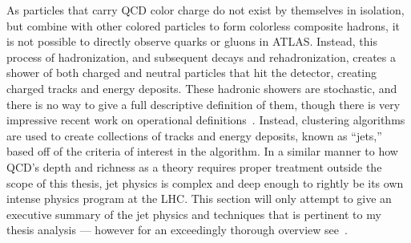 As particles that carry \gls{QCD} color charge do not exist by themselves in isolation, but combine with other colored particles to form colorless composite hadrons, it is not possible to directly observe quarks or gluons in ATLAS.
Instead, this process of hadronization, and subsequent decays and rehadronization, creates a shower of both charged and neutral particles that hit the detector, creating charged tracks and energy deposits.
These hadronic showers are stochastic, and there is no way to give a full descriptive definition of them, though there is very impressive recent work on operational definitions~\cite{Metodiev:2018ftz,Komiske:2018vkc,Larkoski:2019nwj}.
Instead, clustering algorithms are used to create collections of tracks and energy deposits, known as ``jets,'' based off of the criteria of interest in the algorithm.
In a similar manner to how QCD's depth and richness as a theory requires proper treatment outside the scope of this thesis, jet physics is complex and deep enough to rightly be its own intense physics program at the LHC.
This section will only attempt to give an executive summary of the jet physics and techniques that is pertinent to my thesis analysis --- however for an exceedingly thorough overview see~\cite{Nachman:2016qyc}.

